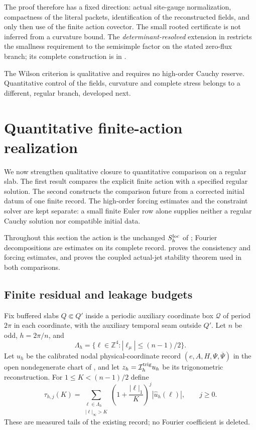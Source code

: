 \documentclass[11pt]{article}
\numberwithin{equation}{section}
\theoremstyle{definition}
\theoremstyle{remark}
\newcommand{\Z}{\mathbb Z}
\newcommand{\bPsi}{\overline\Psi}
\begin{document}
The proof therefore has a fixed direction: actual site-gauge normalization,
compactness of the literal packets, identification of the reconstructed
fields, and only then use of the finite action covector. The small rooted
certificate is not inferred from a curvature bound. The
\emph{determinant-resolved} extension in
 restricts the smallness requirement
to the semisimple factor on the stated zero-flux branch; its complete
construction is in .

The Wilson criterion is qualitative and requires no high-order Cauchy
reserve. Quantitative control of the fields, curvature and complete stress
belongs to a different, regular branch, developed next.

\section{Quantitative finite-action realization}
\label{sec:native-branch}

We now strengthen qualitative closure to quantitative comparison on a
regular slab. The first result compares the explicit finite action with a
specified regular solution. The second constructs the comparison future
from a corrected initial datum of one finite record. The high-order
forcing estimates and the constraint solver are kept separate: a small
finite Euler row alone supplies neither a regular Cauchy solution nor
compatible initial data.

Throughout this section the action is the unchanged $S_h^{\rm loc}$ of
; Fourier decompositions are estimates on its
complete record.  proves the consistency
and forcing estimates, and  proves the
coupled actual-jet stability theorem used in both comparisons.

\subsection{Finite residual and leakage budgets}

Fix buffered slabs $Q\Subset Q'$ inside a periodic auxiliary coordinate box $\mathscr Q$ of period $2\pi$ in each coordinate, with the auxiliary temporal seam outside $Q'$.  Let $n$ be odd, $h=2\pi/n$, and
\[
 \Lambda_h=\{\ell\in\Z^4:|\ell_\mu|\le(n-1)/2\}.
\]
Let $u_h$ be the calibrated nodal physical-coordinate record $(e,A,H,\Psi,\bPsi)$ in the open nondegenerate chart of , and let $z_h=\mathcal I_h^{\rm trig}u_h$ be its trigonometric reconstruction.  For $1\le K<(n-1)/2$ define
\begin{equation}
 \tau_{h,j}(K)=\sum_{\substack{\ell\in\Lambda_h\\|\ell|_\infty>K}}
 \left(1+\frac{|\ell|_1}{K}\right)^j|\widehat u_h(\ell)|,
 \qquad j\ge0.
 \label{eq:native-tail}
\end{equation}
These are measured tails of the existing record; no Fourier coefficient is deleted.
\end{document}
